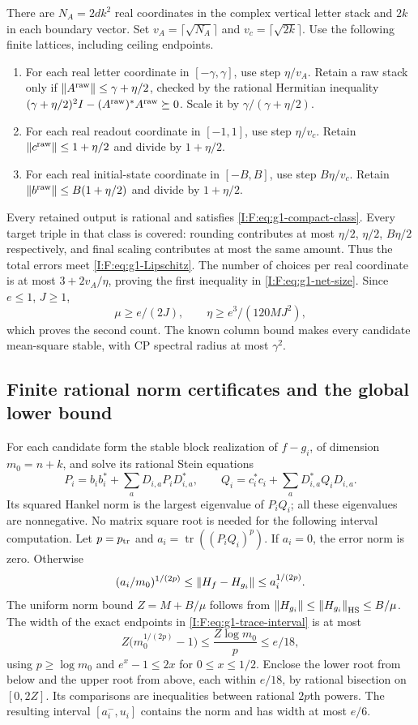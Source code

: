 There are $N_A=2dk^2$ real coordinates in the complex vertical letter stack
and $2k$ in each boundary vector. Set
$v_A=\lceil\sqrt{N_A}\rceil$ and $v_c=\lceil\sqrt{2k}\rceil$.
Use the following finite lattices, including ceiling endpoints.
\begin{enumerate}[leftmargin=*]
\item For each real letter coordinate in $[-\gamma,\gamma]$, use step
$\eta/v_A$. Retain a raw stack only if
$\left\lVert A^{\rm raw}\right\rVert\le\gamma+\eta/2$, checked by the rational Hermitian
inequality $(\gamma+\eta/2)^2I-(A^{\rm raw})^*A^{\rm raw}\succeq0$.
Scale it by $\gamma/(\gamma+\eta/2)$.
\item For each real readout coordinate in $[-1,1]$, use step $\eta/v_c$.
Retain $\left\lVert c^{\rm raw}\right\rVert\le1+\eta/2$ and divide by $1+\eta/2$.
\item For each real initial-state coordinate in $[-B,B]$, use step
$B\eta/v_c$. Retain $\left\lVert b^{\rm raw}\right\rVert\le B(1+\eta/2)$ and divide by
$1+\eta/2$.
\end{enumerate}
Every retained output is rational and satisfies
\eqref{I:F:eq:g1-compact-class}. Every target triple in that class is covered:
rounding contributes at most $\eta/2$, $\eta/2$, $B\eta/2$ respectively,
and final scaling contributes at most the same amount. Thus the total
errors meet \eqref{I:F:eq:g1-Lipschitz}. The number of choices per real
coordinate is at most $3+2v_A/\eta$, proving the first inequality in
\eqref{I:F:eq:g1-net-size}. Since $e\le1$, $J\ge1$,
\[
 \mu\ge e/(2J),\qquad \eta\ge e^3/(120MJ^2),
\]
which proves the second count. The known column bound makes every candidate
mean-square stable, with CP spectral radius at most $\gamma^2$.

\subsection{Finite rational norm certificates and the global lower bound}

For each candidate form the stable block realization of $f-g_i$, of
dimension $m_0=n+k$, and solve its rational Stein equations
\[
 P_i=b_ib_i^*+\sum_aD_{i,a}P_iD_{i,a}^*,\qquad
 Q_i=c_i^*c_i+\sum_aD_{i,a}^*Q_iD_{i,a}.
\]
Its squared Hankel norm is the largest eigenvalue of $P_iQ_i$; all these
eigenvalues are nonnegative. No matrix square root is needed for the
following interval computation. Let $p=p_{\rm tr}$ and
$a_i=\operatorname{tr}((P_iQ_i)^p)$. If $a_i=0$, the error norm is zero.
Otherwise
\begin{equation}
 (a_i/m_0)^{1/(2p)}\le\left\lVert H_f-H_{g_i}\right\rVert
                         \le a_i^{1/(2p)}.
 \label{I:F:eq:g1-trace-interval}
\end{equation}
The uniform norm bound $Z=M+B/\mu$ follows from
$\left\lVert H_{g_i}\right\rVert\le\left\lVert H_{g_i}\right\rVert_{\rm HS}\le B/\mu$.
The width of the exact endpoints in \eqref{I:F:eq:g1-trace-interval} is at most
\[
 Z\bigl(m_0^{1/(2p)}-1\bigr)
 \le\frac{Z\log m_0}{p}\le e/18,
\]
using $p\ge\log m_0$ and $e^x-1\le2x$ for $0\le x\le1/2$.
Enclose the lower root from below and the upper root from above, each
within $e/18$, by rational bisection on $[0,2Z]$. Its comparisons are
inequalities between rational $2p$th powers. The resulting interval
$[a_i^-,u_i]$ contains the norm and has width at most $e/6$.

